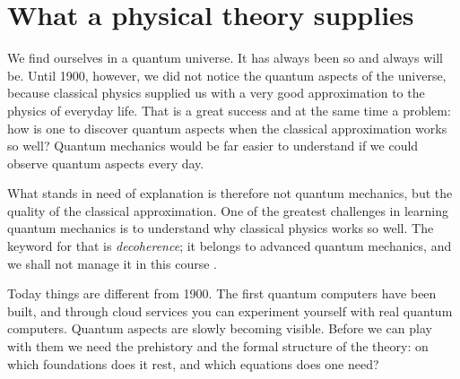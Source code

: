 %

\chapter{What a physical theory supplies}\label{c00}

We find ourselves in a quantum universe. It has always been so and always will be. Until
1900, however, we did not notice the quantum aspects of the universe, because classical
physics supplied us with a very good approximation to the physics of everyday life. That is
a great success and at the same time a problem: how is one to discover quantum aspects when
the classical approximation works so well? Quantum mechanics would be far easier to
understand if we could observe quantum aspects every day.

What stands in need of explanation is therefore not quantum mechanics, but the quality of
the classical approximation. One of the greatest challenges in learning quantum mechanics is
to understand why classical physics works so well. The keyword for that is
\emph{decoherence}; it belongs to advanced quantum mechanics, and we shall not manage it in
this course .

Today things are different from 1900. The first quantum computers have been built, and
through cloud services you can experiment yourself with real quantum computers. Quantum aspects are slowly becoming visible. Before we can play with them we need
the prehistory and the formal structure of the theory: on which foundations does it rest,
and which equations does one need?

